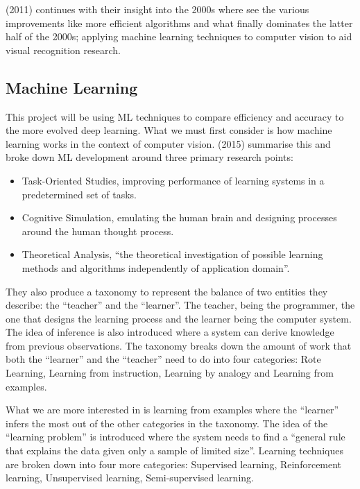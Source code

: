 \documentclass{article}
\begin{document}
\par

\citeauthor{SzeliskiRichard2011CV:A} (2011) continues with their insight into the 2000s where see the various 
improvements like more efficient algorithms and what finally dominates the latter half of the 2000s; applying machine 
learning techniques to computer vision to aid visual recognition research.

\subsection{Machine Learning}

This project will be using ML techniques to compare efficiency and accuracy to the more evolved deep learning. 
What we must first consider is how machine learning works in the context of computer vision. 
\citeauthor{CamastraFrancescoMLfA} (2015) summarise this and broke down ML development around three primary research 
points:

\begin{itemize}
    \item Task-Oriented Studies, improving performance of learning systems in a predetermined set of tasks.
    \item Cognitive Simulation, emulating the human brain and designing processes around the human thought process.
    \item Theoretical Analysis, “the theoretical investigation of possible learning methods and algorithms 
    independently of application domain”.
\end{itemize}

They also produce a taxonomy to represent the balance of two entities they describe: the “teacher” and the “learner”. 
The teacher, being the programmer, the one that designs the learning process and the learner being the computer system. 
The idea of inference is also introduced where a system can derive knowledge from previous observations. The taxonomy 
breaks down the amount of work that both the “learner” and the “teacher” need to do into four categories: Rote Learning,
Learning from instruction, Learning by analogy and Learning from examples.

\par

What we are more interested in is learning from examples where the “learner” infers the most out of the other 
categories in the taxonomy. The idea of the “learning problem” is introduced where the system needs to find a “general 
rule that explains the data given only a sample of limited size”. Learning techniques are broken down into four more 
categories: Supervised learning, Reinforcement learning, Unsupervised learning, Semi-supervised learning.
\end{document}
